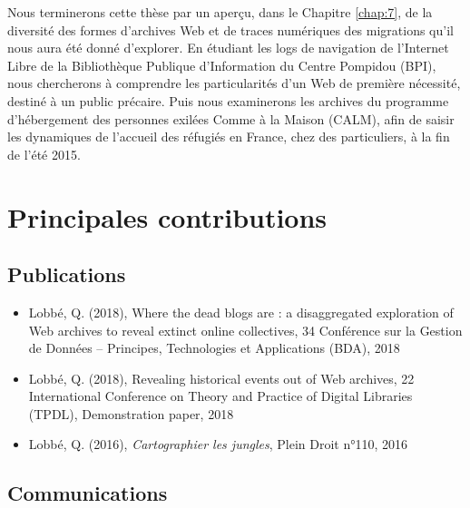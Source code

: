 \documentclass[symmetric,justified,marginals=raggedouter]{tufte-book}
\begin{document}
Nous terminerons cette thèse par un aperçu, dans le Chapitre \ref{chap:7}, de la diversité des formes d'archives Web et de traces numériques des migrations qu'il nous aura été donné d'explorer. En étudiant les logs de navigation de l'Internet Libre de la Bibliothèque Publique d'Information du Centre Pompidou (BPI), nous chercherons à comprendre les particularités d'un Web de première nécessité, destiné à un public précaire. Puis nous examinerons les archives du programme d'hébergement des personnes exilées Comme à la Maison (CALM), afin de saisir les dynamiques de l'accueil des réfugiés en France, chez des particuliers, à la fin de l'été 2015.

\newpage

\section*{Principales contributions}
\label{sec:1_contributions}

\subsection{Publications}

\begin{itemize}[leftmargin=*]  
\item Lobbé, Q. (2018), Where the dead blogs are : a disaggregated exploration of Web archives to reveal extinct online collectives, 34\ieme{} Conférence sur la Gestion de Données – Principes, Technologies et Applications (BDA), 2018
\item Lobbé, Q. (2018), Revealing historical events out of Web archives, 22\ieme{} International Conference on Theory and Practice of Digital Libraries (TPDL), Demonstration paper, 2018
\item Lobbé, Q. (2016), \textit{Cartographier les jungles}, Plein Droit n°110, 2016
\end{itemize}

\subsection{Communications}
\end{document}
